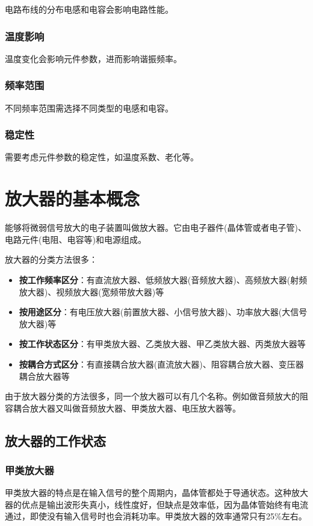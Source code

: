 \documentclass[12pt,UTF8]{ctexbook}
\begin{document}
电路布线的分布电感和电容会影响电路性能。

\subsubsection{温度影响}

温度变化会影响元件参数，进而影响谐振频率。

\subsubsection{频率范围}

不同频率范围需选择不同类型的电感和电容。

\subsubsection{稳定性}

需要考虑元件参数的稳定性，如温度系数、老化等。

\section{放大器的基本概念}

能够将微弱信号放大的电子装置叫做放大器。它由电子器件(晶体管或者电子管)、电路元件(电阻、电容等)和电源组成。

放大器的分类方法很多：

\begin{itemize}[leftmargin=3.5em]
    \item \textbf{按工作频率区分}：有直流放大器、低频放大器(音频放大器)、高频放大器(射频放大器)、视频放大器(宽频带放大器)等
    \item \textbf{按用途区分}：有电压放大器(前置放大器、小信号放大器)、功率放大器(大信号放大器)等
    \item \textbf{按工作状态区分}：有甲类放大器、乙类放大器、甲乙类放大器、丙类放大器等
    \item \textbf{按耦合方式区分}：有直接耦合放大器(直流放大器)、阻容耦合放大器、变压器耦合放大器等
\end{itemize}

由于放大器分类的方法很多，同一个放大器可以有几个名称。例如做音频放大的阻容耦合放大器又叫做音频放大器、甲类放大器、电压放大器等。

\subsection{放大器的工作状态}

\subsubsection{甲类放大器}
甲类放大器的特点是在输入信号的整个周期内，晶体管都处于导通状态。这种放大器的优点是输出波形失真小，线性度好，但缺点是效率低，因为晶体管始终有电流通过，即使没有输入信号时也会消耗功率。甲类放大器的效率通常只有25\%左右。
\end{document}
